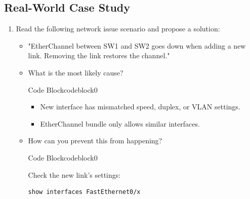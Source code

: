 \documentclass[a4paper]{article}
\begin{document}
\subsection{Real-World Case Study}
\begin{enumerate}
	\item Read the following network issue scenario and propose a solution:
	      \begin{itemize}
		      \item "EtherChannel between SW1 and SW2 goes down when adding a new link. Removing the link restores the channel."
		      \item What is the most likely cause?


		            \begin{ocg}{Code Block}{codeblock}{0}

			            \vspace{0.5cm}

			            \begin{tcolorbox}
				            \begin{itemize}
					            \item New interface has mismatched speed, duplex, or VLAN settings.
					            \item EtherChannel bundle only allows similar interfaces.
				            \end{itemize}
			            \end{tcolorbox}



			            \vspace{0.5cm}
		            \end{ocg}
		      \item How can you prevent this from happening?



		            \begin{ocg}{Code Block}{codeblock}{0}

			            \vspace{0.5cm}
			            Check the new link’s settings:
			            \begin{lstlisting}
show interfaces FastEthernet0/x
                                    \end{lstlisting}



\end{ocg}
\end{itemize}
\end{enumerate}
\end{document}
